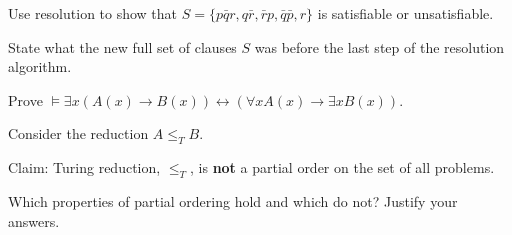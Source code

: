 \documentclass[addpoints]{exam}
\begin{document}
\begin{questions}
	
%
%
%	


\question[4] Use resolution to show that $S=\{p\bar{q}r, q \bar{r}, \bar{r}p, \bar{q}\bar{p}, r \}$ is satisfiable or unsatisfiable.

 State what the new full set of clauses $S$ was before the last step of the resolution algorithm.


\vspace{7cm}






\question[4] Prove $\models \exists x (A(x)\rightarrow B(x)) \leftrightarrow (\forall x A(x) \rightarrow \exists x B(x))$.

\vspace{8cm}

\question[6]
Consider the reduction $A \leq_{T} B$.  

Claim: Turing reduction, $\leq_{T}$, is \textbf{not} a partial order on the set of all problems. 

Which properties of partial ordering hold and which do not? Justify your answers.

\vspace{8cm}



\end{questions}
\end{document}
